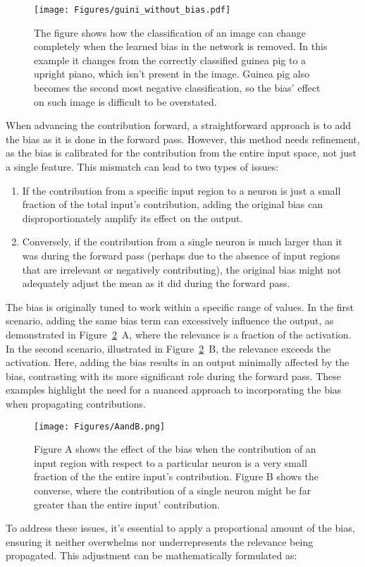 \begin{figure}[ht!]
	\begin{center}
		\texttt{[image: Figures/guini\_without\_bias.pdf]}
	\end{center}
	\caption{The figure shows how the classification of an image can change completely when the learned bias in the network is removed. In this example it changes from the correctly classified guinea pig to a upright piano, which isn't present in the image. Guinea pig also becomes the second most negative classification, so the bias' effect on such image is difficult to be overstated.}
	\label{fig:bias_no_bias}
\end{figure} 
\noindent

When advancing the contribution forward, a straightforward approach is to add the bias as it is done in the forward pass. However, this method needs refinement, as the bias is calibrated for the contribution from the entire input space, not just a single feature. This mismatch can lead to two types of issues:
\begin{enumerate}
    \item If the contribution from a specific input region to a neuron is just a small fraction of the total input's contribution, adding the original bias can disproportionately amplify its effect on the output.
    \item Conversely, if the contribution from a single neuron is much larger than it was during the forward pass (perhaps due to the absence of input regions that are irrelevant or negatively contributing), the original bias might not adequately adjust the mean as it did during the forward pass.
\end{enumerate}

The bias is originally tuned to work within a specific range of values. In the first scenario, adding the same bias term can excessively influence the output, as demonstrated in Figure~\ref{fig:Neurons_with_bias}~A, where the relevance is a fraction of the activation. In the second scenario, illustrated in Figure~\ref{fig:Neurons_with_bias}~B, the relevance exceeds the activation. Here, adding the bias results in an output minimally affected by the bias, contrasting with its more significant role during the forward pass. These examples highlight the need for a nuanced approach to incorporating the bias when propagating contributions.

\begin{figure}[ht!]
	\begin{center}
		\texttt{[image: Figures/AandB.png]}
	\end{center}
	\caption{Figure A shows the effect of the bias when the contribution of an input region with respect to a particular neuron is a very small fraction of the the entire input's contribution. Figure B shows the converse, where the contribution of a single neuron might be far greater than the entire input' contribution.}
	\label{fig:Neurons_with_bias}
\end{figure} 
To address these issues, it's essential to apply a proportional amount of the bias, ensuring it neither overwhelms nor underrepresents the relevance being propagated. This adjustment can be mathematically formulated as:

